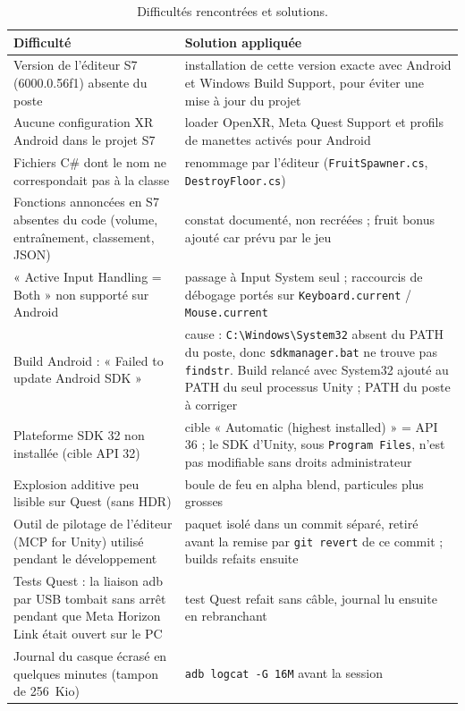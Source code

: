 \documentclass[11pt,a4paper]{article}
\newcommand{\fichier}[1]{\texttt{\small #1}}
\begin{document}
\begin{table}[H]
\centering\small
\caption{Difficultés rencontrées et solutions.}
\begin{tabularx}{\textwidth}{@{}P{4.2cm}L@{}}
\toprule
Difficulté & Solution appliquée \\
\midrule
Version de l'éditeur S7 (6000.0.56f1) absente du poste & installation de cette version exacte avec Android et Windows Build Support, pour éviter une mise à jour du projet \\
Aucune configuration XR Android dans le projet S7 & loader OpenXR, Meta Quest Support et profils de manettes activés pour Android \\
Fichiers C\# dont le nom ne correspondait pas à la classe & renommage par l'éditeur (\fichier{FruitSpawner.cs}, \fichier{DestroyFloor.cs}) \\
Fonctions annoncées en S7 absentes du code (volume, entraînement, classement, JSON) & constat documenté, non recréées ; fruit bonus ajouté car prévu par le jeu \\
« Active Input Handling = Both » non supporté sur Android & passage à Input System seul ; raccourcis de débogage portés sur \texttt{Keyboard.current} / \texttt{Mouse.current} \\
Build Android : « Failed to update Android SDK » & cause : \fichier{C:\textbackslash Windows\textbackslash System32} absent du PATH du poste, donc \fichier{sdkmanager.bat} ne trouve pas \texttt{findstr}. Build relancé avec System32 ajouté au PATH du seul processus Unity ; PATH du poste à corriger \\
Plateforme SDK 32 non installée (cible API 32) & cible « Automatic (highest installed) » = API 36 ; le SDK d'Unity, sous \fichier{Program Files}, n'est pas modifiable sans droits administrateur \\
Explosion additive peu lisible sur Quest (sans HDR) & boule de feu en alpha blend, particules plus grosses \\
Outil de pilotage de l'éditeur (MCP for Unity) utilisé pendant le développement & paquet isolé dans un commit séparé, retiré avant la remise par \texttt{git revert} de ce commit ; builds refaits ensuite \\
\bottomrule
Tests Quest : la liaison adb par USB tombait sans arrêt pendant que Meta Horizon Link était ouvert sur le PC & test Quest refait sans câble, journal lu ensuite en rebranchant \\
Journal du casque écrasé en quelques minutes (tampon de 256~Kio) & \texttt{adb logcat -G 16M} avant la session \\

\end{tabularx}
\end{table}
\end{document}
